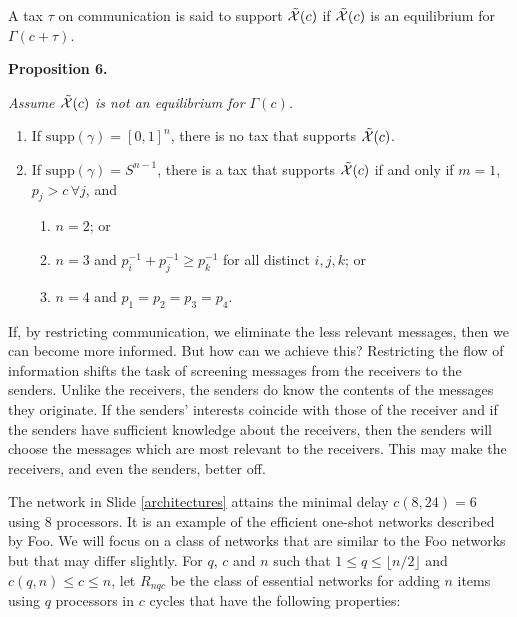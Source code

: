 \documentclass[%
  slidesonly,%
  semlayer%
  ]{seminar}                                  %
\begin{document}
\begin{slide}\label{akbar}\def\slidefuzz{15pt}
  {\large A tax $\tau$ on communication is said to support
$\tilde{\cal{X}}(c)$ if $\tilde{\cal{X}}(c)$ is an equilibrium for
$\Gamma(c+\tau)$.}
\medskip

 {\bf Proposition 6.} {\em Assume $\tilde{\cal{X}}(c)$ is not an equilibrium
for $\Gamma(c)$.\vspace{-3pt}
\begin{enumerate}
 \item If $\mbox{supp}(\gamma)=[0,1]^n$, there is no tax that supports
$\tilde{\cal{X}}(c)$.
 \item If $\mbox{supp}(\gamma)=S^{n-1}$, there is a tax that supports
$\tilde{\cal{X}}(c)$ if and only if $m=1$, $p_j>c\, \forall j$, and
   \begin{enumerate}
     \item $n=2$; or
     \item $n=3$ and $p_i^{-1}+p_j^{-1}\geq p_k^{-1}$ for all distinct
$i,j,k$; or
     \item $n=4$ and $p_1=p_2=p_3=p_4$.
\end{enumerate}
\end{enumerate}}
\end{slide}

  If, by restricting communication, we eliminate the less relevant messages,
then we can become more informed. But how can we achieve this? Restricting the
flow of information shifts the task of screening messages from the receivers
to the senders. Unlike the receivers, the senders do know the contents of the
messages they originate. If the senders' interests coincide with those of the
receiver and if the senders have sufficient knowledge about the receivers,
then the senders will choose the messages which are most relevant to the
receivers. This may make the receivers, and even the senders, better off.

  The network in Slide \ref{architectures} attains the minimal delay $c(8,24)
= 6$ using 8 processors. It is an example of the efficient one-shot networks
described by Foo. We will focus on a class of networks that are similar to the
Foo networks but that may differ slightly. For $q$, $c$ and $n$ such that $1
\leq q \leq \lfloor n/2 \rfloor$ and $c(q,n) \leq c \leq n$, let $R_{nqc}$ be
the class of essential networks for adding $n$ items using  $q$ processors in
$c$ cycles that have the following  properties:
\end{document}
